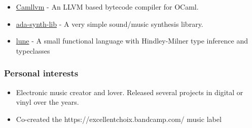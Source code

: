 \documentclass[10pt,letterpaper]{article}
\providecommand{\tightlist}{%
  \setlength{\itemsep}{0pt}\setlength{\parskip}{0pt}}
\begin{document}
\begin{itemize}
\item
  \href{https://github.com/raph-amiard/CamllVM}{Camllvm} - An LLVM based
  bytecode compiler for OCaml.
\item
  \href{https://github.com/raph-amiard/ada-synth-lib}{ada-synth-lib} - A
  very simple sound/music synthesis library.
\item
  \href{https://github.com/raph-amiard/Lune}{lune} - A small functional
  language with Hindley-Milner type inference and typeclasses
\end{itemize}

\hypertarget{personal-interests}{%
\subsubsection{Personal interests}\label{personal-interests}}

\begin{itemize}
\tightlist
\item
  Electronic music creator and lover. Released several projects in
  digital or vinyl over the years.
\item
  Co-created the https://excellentchoix.bandcamp.com/ music label
\end{itemize}
\end{document}
